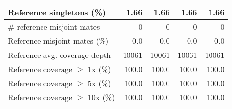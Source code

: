 \documentclass[12pt,a4paper]{article}
\begin{document}
\begin{table}[ht]
\begin{center}
\begin{tabular}{|l*{4}{|r}|}
Reference singletons (\%) & 1.66 & 1.66 & 1.66 & 1.66 \\ \hline
\# reference misjoint mates & 0 & 0 & 0 & 0 \\ \hline
Reference misjoint mates (\%) & 0.0 & 0.0 & 0.0 & 0.0 \\ \hline
Reference avg. coverage depth & 10061 & 10061 & 10061 & 10061 \\ \hline
Reference coverage $\geq$ 1x (\%) & 100.0 & 100.0 & 100.0 & 100.0 \\ \hline
Reference coverage $\geq$ 5x (\%) & 100.0 & 100.0 & 100.0 & 100.0 \\ \hline
Reference coverage $\geq$ 10x (\%) & 100.0 & 100.0 & 100.0 & 100.0 \\ \hline
\end{tabular}
\end{center}
\end{table}
\end{document}
